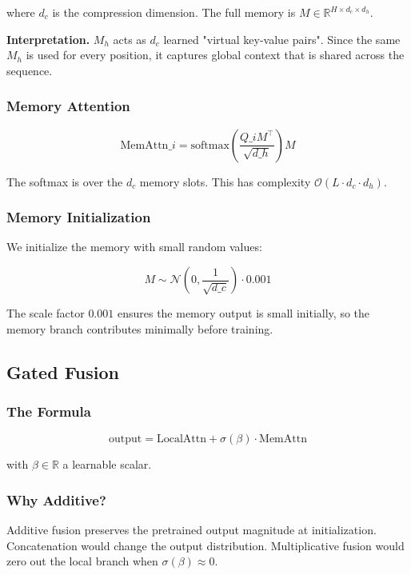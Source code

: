 where $d_c$ is the compression dimension. The full memory is 
$M \in \mathbb{R}^{H \times d_c \times d_h}$.

\textbf{Interpretation.} $M_h$ acts as $d_c$ learned "virtual key-value pairs". 
Since the same $M_h$ is used for every position, it captures global context 
that is shared across the sequence.

\subsubsection{Memory Attention}

\[
\text{MemAttn}\_i = \text{softmax}\!\left(\frac{Q\_i M^\top}{\sqrt{d\_h}}\right) M
\tag{4.5}
\]

The softmax is over the $d_c$ memory slots. This has complexity 
$\mathcal{O}(L \cdot d_c \cdot d_h)$.

\subsubsection{Memory Initialization}

We initialize the memory with small random values:

\[
M \sim \mathcal{N}\!\left(0, \frac{1}{\sqrt{d\_c}}\right) \cdot 0.001
\tag{4.6}
\]

The scale factor $0.001$ ensures the memory output is small initially, 
so the memory branch contributes minimally before training.

\subsection{Gated Fusion}

\subsubsection{The Formula}

\[
\text{output} = \text{LocalAttn} + \sigma(\beta) \cdot \text{MemAttn}
\tag{4.7}
\]

with $\beta \in \mathbb{R}$ a learnable scalar.

\subsubsection{Why Additive?}

Additive fusion preserves the pretrained output magnitude at initialization. 
Concatenation would change the output distribution. Multiplicative fusion 
would zero out the local branch when $\sigma(\beta) \approx 0$.

